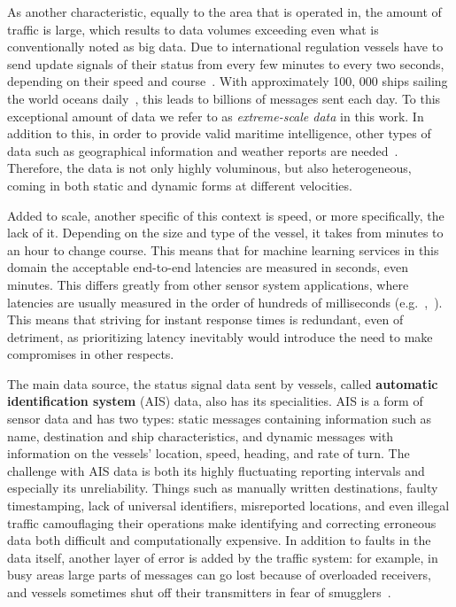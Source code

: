 As another characteristic, equally to the area that is operated in, the amount of traffic is large, which results to data volumes exceeding even what is conventionally noted as big data. Due to international regulation vessels have to send update signals of their status from every few minutes to every two seconds, depending on their speed and course~\cite{maritimeinformatics}. With approximately 100, 000 ships sailing the world oceans daily~\cite{maritimeinformatics}, this leads to billions of messages sent each day. To this exceptional amount of data we refer to as \textit{extreme-scale data} in this work. In addition to this, in order to provide valid maritime intelligence, other types of data such as geographical information and weather reports are needed~\cite{D1.1}. Therefore, the data is not only highly voluminous, but also heterogeneous, coming in both static and dynamic forms at different velocities.

Added to scale, another specific of this context is speed, or more specifically, the lack of it. Depending on the size and type of the vessel, it takes from minutes to an hour to change course. This means that for machine learning services in this domain the acceptable end-to-end latencies are measured in seconds, even minutes. This differs greatly from other sensor system applications, where latencies are usually measured in the order of hundreds of milliseconds (e.g.~\cite{facebook},~\cite{edgelatency}). This means that striving for instant response times is redundant, even of detriment, as prioritizing latency inevitably would introduce the need to make compromises in other respects.

The main data source, the status signal data sent by vessels, called \textbf{automatic identification system} (AIS) data, also has its specialities. AIS is a form of sensor data and has two types: static messages containing information such as name, destination and ship characteristics, and dynamic messages with information on the vessels' location, speed, heading, and rate of turn. The challenge with AIS data is both its highly fluctuating reporting intervals and especially its unreliability.  Things such as manually written destinations, faulty timestamping, lack of universal identifiers, misreported locations, and even illegal traffic camouflaging their operations make identifying and correcting erroneous data both difficult and computationally expensive. In addition to faults in the data itself, another layer of error is added by the traffic system: for example, in busy areas large parts of messages can go lost because of overloaded receivers, and vessels sometimes shut off their transmitters in fear of smugglers~\cite{maritimeinformatics}.

